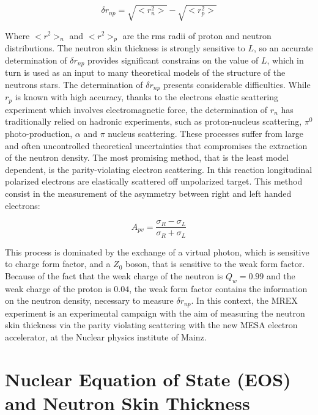 \begin{equation} \label{eq:NeutronSkin}
\delta r_{np} = \sqrt{<r^{2}_{n}>} - \sqrt{<r^{2}_{p}>}
\end{equation}

Where $<r^{2}>_{n}$ and $<r^{2}>_{p}$ are the rms radii of proton and neutron distributions.
The neutron skin thickness is strongly sensitive to $L$, so an accurate determination of $\delta r_{np}$ provides significant constrains on the value of $L$, which in turn is used as an input to many theoretical models of the structure of the neutrons stars.
The determination of $\delta r_{np}$ presents considerable difficulties. While $r_{p}$ is known with high accuracy, thanks to the electrons elastic scattering experiment which involves electromagnetic force, the determination of $r_{n}$ has traditionally relied on hadronic experiments, such as proton-nucleus scattering, $\pi^{0}$ photo-production, $\alpha$ and $\pi$ nucleus scattering. These processes suffer from large and often uncontrolled theoretical uncertainties that compromises the extraction of the neutron density. The most promising method, that is the least model dependent, is the parity-violating electron scattering. In this reaction longitudinal polarized electrons are elastically scattered off unpolarized target. This method consist in the measurement of the asymmetry between right and left handed electrons:

\begin{equation}
A_{pv} = \dfrac{\sigma_{R} - \sigma_{L}}{\sigma_{R} + \sigma_{L}}
\end{equation}

This process is dominated by the exchange of a virtual photon, which is sensitive to charge form factor, and a $Z_{0}$ boson, that is sensitive to the weak form factor. Because of the fact that the weak charge of the neutron is $Q_{w} = 0.99$ and the weak charge of the proton is $0.04$, the weak form factor contains the information on the neutron density, necessary to measure $\delta r_{np}$. In this context, the MREX experiment is an experimental campaign with the aim of measuring the neutron skin thickness via the parity violating scattering with the new MESA electron accelerator, at the Nuclear physics institute of Mainz.

\section{Nuclear Equation of State (EOS) and Neutron Skin Thickness}

